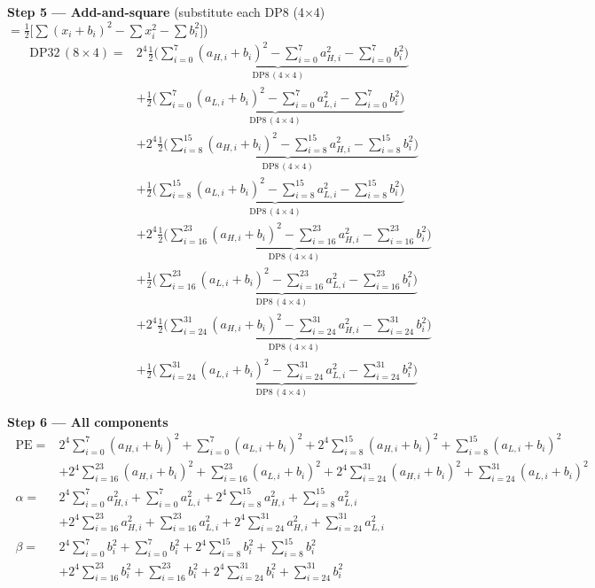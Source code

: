 \documentclass[fleqn]{article}
\newcommand{\DPop}[3]{\mathrm{DP#1}\,(#2\!\times\!#3)}
\begin{document}
\textbf{Step 5 --- Add-and-square}\quad
{\small(substitute each DP8 (4$\times$4) $= \tfrac{1}{2}\big[\sum(x_i{+}b_i)^2 - \sum x_i^2 - \sum b_i^2\big]$)}
\begin{align*}
\DPop{32}{8}{4} = {}
  & 2^{4}\underbrace{\tfrac{1}{2}\Big(\sum_{i=0}^{7}(a_{H,i}{+}b_i)^2 - \sum_{i=0}^{7}a_{H,i}^2 - \sum_{i=0}^{7}b_i^2\Big)}_{\DPop{8}{4}{4}} \\[0.7em]
  & + \underbrace{\tfrac{1}{2}\Big(\sum_{i=0}^{7}(a_{L,i}{+}b_i)^2 - \sum_{i=0}^{7}a_{L,i}^2 - \sum_{i=0}^{7}b_i^2\Big)}_{\DPop{8}{4}{4}} \\[0.7em]
  & + 2^{4}\underbrace{\tfrac{1}{2}\Big(\sum_{i=8}^{15}(a_{H,i}{+}b_i)^2 - \sum_{i=8}^{15}a_{H,i}^2 - \sum_{i=8}^{15}b_i^2\Big)}_{\DPop{8}{4}{4}} \\[0.7em]
  & + \underbrace{\tfrac{1}{2}\Big(\sum_{i=8}^{15}(a_{L,i}{+}b_i)^2 - \sum_{i=8}^{15}a_{L,i}^2 - \sum_{i=8}^{15}b_i^2\Big)}_{\DPop{8}{4}{4}} \\[0.7em]
  & + 2^{4}\underbrace{\tfrac{1}{2}\Big(\sum_{i=16}^{23}(a_{H,i}{+}b_i)^2 - \sum_{i=16}^{23}a_{H,i}^2 - \sum_{i=16}^{23}b_i^2\Big)}_{\DPop{8}{4}{4}} \\[0.7em]
  & + \underbrace{\tfrac{1}{2}\Big(\sum_{i=16}^{23}(a_{L,i}{+}b_i)^2 - \sum_{i=16}^{23}a_{L,i}^2 - \sum_{i=16}^{23}b_i^2\Big)}_{\DPop{8}{4}{4}} \\[0.7em]
  & + 2^{4}\underbrace{\tfrac{1}{2}\Big(\sum_{i=24}^{31}(a_{H,i}{+}b_i)^2 - \sum_{i=24}^{31}a_{H,i}^2 - \sum_{i=24}^{31}b_i^2\Big)}_{\DPop{8}{4}{4}} \\[0.7em]
  & + \underbrace{\tfrac{1}{2}\Big(\sum_{i=24}^{31}(a_{L,i}{+}b_i)^2 - \sum_{i=24}^{31}a_{L,i}^2 - \sum_{i=24}^{31}b_i^2\Big)}_{\DPop{8}{4}{4}}
\end{align*}

\textbf{Step 6 --- All components}
\[
\boxed{\;
\begin{aligned}
\mathrm{PE} ={}& 2^{4}\sum_{i=0}^{7}(a_{H,i}{+}b_i)^2 + \sum_{i=0}^{7}(a_{L,i}{+}b_i)^2 + 2^{4}\sum_{i=8}^{15}(a_{H,i}{+}b_i)^2 + \sum_{i=8}^{15}(a_{L,i}{+}b_i)^2 \\
  & + 2^{4}\sum_{i=16}^{23}(a_{H,i}{+}b_i)^2 + \sum_{i=16}^{23}(a_{L,i}{+}b_i)^2 + 2^{4}\sum_{i=24}^{31}(a_{H,i}{+}b_i)^2 + \sum_{i=24}^{31}(a_{L,i}{+}b_i)^2 \\[0.6em]
\alpha ={}& 2^{4}\sum_{i=0}^{7}a_{H,i}^2 + \sum_{i=0}^{7}a_{L,i}^2 + 2^{4}\sum_{i=8}^{15}a_{H,i}^2 + \sum_{i=8}^{15}a_{L,i}^2 \\
  & + 2^{4}\sum_{i=16}^{23}a_{H,i}^2 + \sum_{i=16}^{23}a_{L,i}^2 + 2^{4}\sum_{i=24}^{31}a_{H,i}^2 + \sum_{i=24}^{31}a_{L,i}^2 \\[0.6em]
\beta ={}& 2^{4}\sum_{i=0}^{7}b_i^2 + \sum_{i=0}^{7}b_i^2 + 2^{4}\sum_{i=8}^{15}b_i^2 + \sum_{i=8}^{15}b_i^2 \\
  & + 2^{4}\sum_{i=16}^{23}b_i^2 + \sum_{i=16}^{23}b_i^2 + 2^{4}\sum_{i=24}^{31}b_i^2 + \sum_{i=24}^{31}b_i^2
\end{aligned}
\;}
\]
\end{document}
